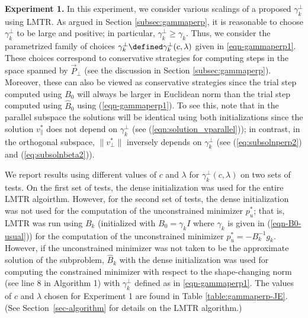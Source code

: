 \medskip

\noindent
{\bf Experiment 1.}
In this experiment, we consider various scalings of a proposed $ \gamma^{\perp}_{k} $ using
{\small LMTR}.  
As argued in Section \ref{subsec:gammaperp},  it is reasonable
to choose $\gamma_k^\perp$ to be large and positive; in particular, 
$\gamma_k^\perp\ge\gamma_k$.  Thus, we 
consider the parametrized family of choices $\gamma_k^{\perp} \defined \gamma_k^{\perp}(c,\lambda)$
given in \eqref{eqn-gammaperp1}.
	These choices correspond
        to conservative strategies for computing steps in the space spanned
        by $ \vec{P}_{\perp} $ (see the discussion in Section \ref{subsec:gammaperp}).
Moreover, these can also be viewed as conservative strategies since
the trial step computed using $B_0$ will always be larger in Euclidean
norm than the trial step computed using $\widehat{B}_0$ using (\ref{eqn-gammaperp1}).
To see this, note that in the parallel subspace the solutions will
be identical using both initializations since the solution $v_\parallel^*$ does
not depend on $\gamma_k^\perp$ (see (\ref{eqn:solution_vparallel})); in contrast,
in the orthogonal subspace, $\|v_\perp^*\|$ inversely depends on $\gamma_k^\perp$
(see (\ref{eq:subsolnperp2}) and (\ref{eq:subsolnbeta2})).

\medskip

We report results using different
values of $c$ and $\lambda$ for $\gamma^\perp_k(c,\lambda)$ 
on two sets of tests.  
On the first set of tests, 
the dense initialization was used for the entire {\small LMTR} algoirthm.
However, for the second set of tests, 
the dense initialization was not used for the computation
of the unconstrained minimizer $p_u^*$;  
that is,  {\small LMTR} was run
using $B_k$ (initialized with $B_0=\gamma_k I$ where $\gamma_k$ is given in
(\ref{eqn-B0-usual})) for the computation of the unconstrained minimizer
$p_u^*=-B_k^{-1}g_k$.  However, if the unconstrained minimizer was not
taken to be the approximate solution of the subproblem, $\widehat{B}_k$
with the dense initialization was used for computing the constrained minimizer
with respect to the shape-changing norm (see line 8 in Algorithm 1)
with
$\gamma_k^{\perp}$ defined as in \eqref{eqn-gammaperp1}.
The values of $c$ and $\lambda$ chosen for Experiment 1 are found in Table \ref{table:gammaperp-JE}.
(See Section~\ref{sec-algorithm} for details on the {\small LMTR} algorithm.)

